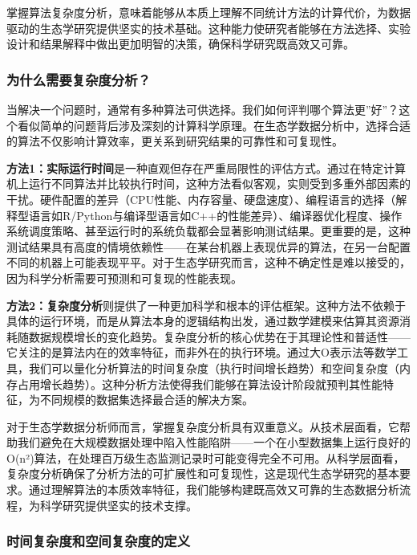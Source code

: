 \documentclass[
]{book}
\begin{document}
掌握算法复杂度分析，意味着能够从本质上理解不同统计方法的计算代价，为数据驱动的生态学研究提供坚实的技术基础。这种能力使研究者能够在方法选择、实验设计和结果解释中做出更加明智的决策，确保科学研究既高效又可靠。

\hypertarget{ux4e3aux4ec0ux4e48ux9700ux8981ux590dux6742ux5ea6ux5206ux6790}{%
\subsubsection{为什么需要复杂度分析？}\label{ux4e3aux4ec0ux4e48ux9700ux8981ux590dux6742ux5ea6ux5206ux6790}}

当解决一个问题时，通常有多种算法可供选择。我们如何评判哪个算法更''好''？这个看似简单的问题背后涉及深刻的计算科学原理。在生态学数据分析中，选择合适的算法不仅影响计算效率，更关系到研究结果的可靠性和可复现性。

\textbf{方法1：实际运行时间}是一种直观但存在严重局限性的评估方式。通过在特定计算机上运行不同算法并比较执行时间，这种方法看似客观，实则受到多重外部因素的干扰。硬件配置的差异（CPU性能、内存容量、硬盘速度）、编程语言的选择（解释型语言如R/Python与编译型语言如C++的性能差异）、编译器优化程度、操作系统调度策略、甚至运行时的系统负载都会显著影响测试结果。更重要的是，这种测试结果具有高度的情境依赖性------在某台机器上表现优异的算法，在另一台配置不同的机器上可能表现平平。对于生态学研究而言，这种不确定性是难以接受的，因为科学分析需要可预测和可复现的性能表现。

\textbf{方法2：复杂度分析}则提供了一种更加科学和根本的评估框架。这种方法不依赖于具体的运行环境，而是从算法本身的逻辑结构出发，通过数学建模来估算其资源消耗随数据规模增长的变化趋势。复杂度分析的核心优势在于其理论性和普适性------它关注的是算法内在的效率特征，而非外在的执行环境。通过大O表示法等数学工具，我们可以量化分析算法的时间复杂度（执行时间增长趋势）和空间复杂度（内存占用增长趋势）。这种分析方法使得我们能够在算法设计阶段就预判其性能特征，为不同规模的数据集选择最合适的解决方案。

对于生态学数据分析师而言，掌握复杂度分析具有双重意义。从技术层面看，它帮助我们避免在大规模数据处理中陷入性能陷阱------一个在小型数据集上运行良好的O(n²)算法，在处理百万级生态监测记录时可能变得完全不可用。从科学层面看，复杂度分析确保了分析方法的可扩展性和可复现性，这是现代生态学研究的基本要求。通过理解算法的本质效率特征，我们能够构建既高效又可靠的生态数据分析流程，为科学研究提供坚实的技术支撑。

\hypertarget{ux65f6ux95f4ux590dux6742ux5ea6ux548cux7a7aux95f4ux590dux6742ux5ea6ux7684ux5b9aux4e49}{%
\subsubsection{时间复杂度和空间复杂度的定义}\label{ux65f6ux95f4ux590dux6742ux5ea6ux548cux7a7aux95f4ux590dux6742ux5ea6ux7684ux5b9aux4e49}}
\end{document}
